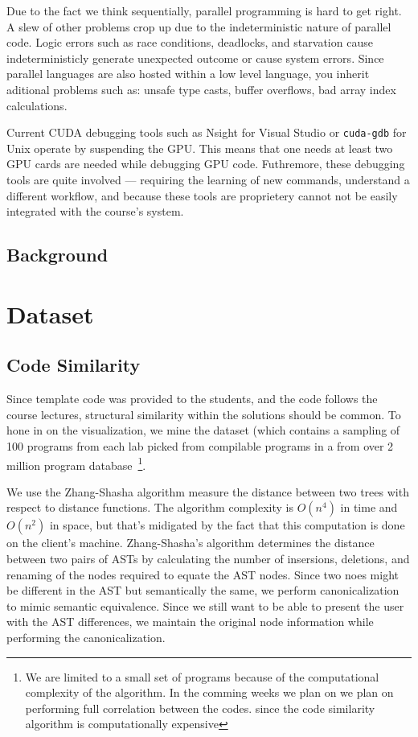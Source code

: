 \documentclass[nocopyrightspace]{sigchi}
\begin{document}
Due to the fact we think sequentially, parallel programming is hard to get
right. A slew of other problems crop up due to the  indeterministic nature of
parallel code. Logic errors such as race conditions, deadlocks, and starvation
cause indeterministicly generate unexpected outcome or cause system errors.
Since parallel languages are also hosted within a low level language,
you inherit aditional problems such as: unsafe type casts, buffer overflows,
bad array index calculations.

Current CUDA debugging tools such as Nsight for Visual Studio or {\tt cuda-gdb}
for Unix operate by suspending the GPU. This means that one needs at least two
GPU cards are needed while debugging GPU code. Futhremore, these debugging tools
are quite involved --- requiring the learning of new commands, understand a
different workflow, and because these tools are proprietery cannot not be easily
integrated with the course's system.


\subsection{Background}

\section{Dataset}


\subsection{Code Similarity}

Since template code was provided to the students, and the code follows the course
lectures, structural similarity within the solutions should be common. To hone in
on the visualization, we mine the dataset (which contains a sampling of 100 programs
from each lab picked from compilable programs in a  from over 2 million program
database~\footnote{We are limited to a small set of programs because
of the computational complexity of the algorithm. In the comming weeks we plan on
we plan on performing full correlation between the codes. since
the code similarity algorithm is computationally expensive}.

We use the Zhang-Shasha algorithm measure the distance between two trees with respect to
distance functions. The algorithm complexity is $O(n^4)$ in time and $O(n^2)$ in space, but
that's midigated by the fact that this computation is done on the client's machine.
Zhang-Shasha's algorithm determines the distance between two pairs of ASTs by
calculating the number of insersions, deletions, and renaming of the nodes
required to equate the AST nodes. Since two noes might be different in the AST but semantically
the same, we perform canonicalization to mimic semantic equivalence. Since we still want
to be able to present the user with the AST differences, we maintain the original node
information while performing the canonicalization.
\end{document}
